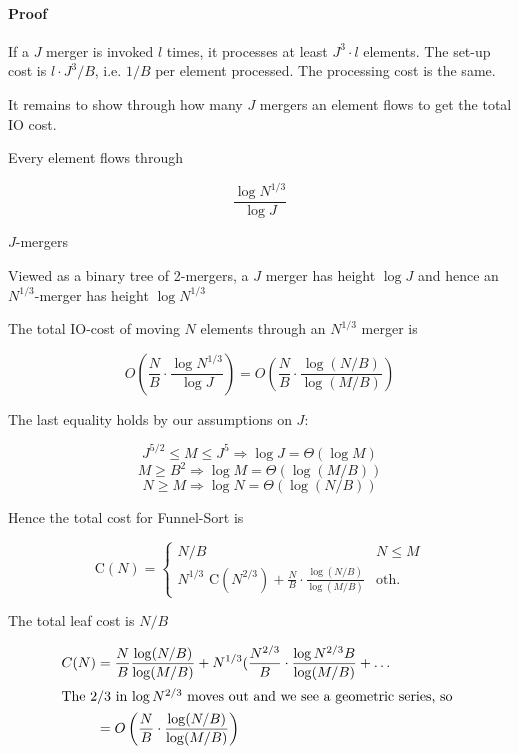 \paragraph{Proof} If a $J$ merger is invoked $l$ times, it processes at least $J^3\cdot l$ elements. The set-up cost is $l\cdot J^3/B$, i.e. $1/B$ per element processed. The processing cost is the same.

It remains to show through how many $J$ mergers an element flows to get the total IO cost.

\begin{lem} Every element flows through

\[\frac{\log N^{1/3}}{\log J}\]

$J$-mergers
\end{lem}

\begin{pr} Viewed as a binary tree of 2-mergers, a $J$ merger has height $\log J$ and hence an $N^{1/3}$-merger has height $\log N^{1/3}$\end{pr}

\begin{thm} The total IO-cost of moving $N$ elements through an $N^{1/3}$ merger is

\[O\left(\frac NB \cdot \frac{\log N^{1/3}}{\log J}\right) = O\left(\frac NB \cdot \frac{\log (N/B)}{\log (M/B)}\right)\]
\end{thm}

The last equality holds by our assumptions on $J$:

\[J^{5/2} \leq M \leq J^5 \Rightarrow \log J = \Theta(\log M)\]
\[M\geq B^2 \Rightarrow \log M = \Theta(\log (M/B))\]
\[N\geq M \Rightarrow \log N = \Theta(\log (N/B))\]

Hence the total cost for Funnel-Sort is

\[\text{C}(N) = \begin{cases}
N/B & N\leq M\\
N^{1/3} \text{ C}(N^{2/3}) + \frac{N}{B} \cdot \frac{\log (N/B)}{\log (M/B)} & \text{oth.}
\end{cases}\]

The total leaf cost is $N/B$

\begin{align*}
C(N) &= \frac NB \frac{\log (N/B)}{\log (M/B)} + N^{1/3} (\frac{N^{2/3}}{B} \cdot \frac{\log N^{2/3}B}{\log (M/B)} + \ldots\\
\intertext{The $2/3$ in $\log N^{2/3}$ moves out and we see a geometric series, so }
&=O\left(\frac{N}{B}\cdot \frac{\log (N/B)}{\log (M/B)}\right)
\end{align*}
